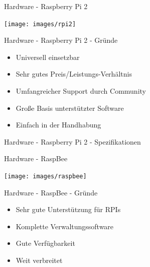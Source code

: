 \begin{frame}{Hardware - Raspberry Pi 2}
  \begin{center}
    \texttt{[image: images/rpi2]}
    \label{fig:rpi}
  \end{center}
\end{frame}

\begin{frame}{Hardware - Raspberry Pi 2 - Gründe}
  \Large
  \begin{itemize}
    \item Universell einsetzbar
    \item Sehr gutes Preis/Leistungs-Verhältnis
    \item Umfangreicher Support durch Community
    \item Große Basis unterstützter Software
    \item Einfach in der Handhabung
  \end{itemize}
\end{frame}

\begin{frame}{Hardware - Raspberry Pi 2 - Spezifikationen}
  \Large

\end{frame}

\begin{frame}{Hardware - RaspBee}
  \begin{center}
    \texttt{[image: images/raspbee]}
    \label{fig:rbee}
  \end{center}
\end{frame}

\begin{frame}{Hardware - RaspBee - Gründe}
  \Large
  \begin{itemize}
    \item Sehr gute Unterstützung für RPIs
    \item Komplette Verwaltungssoftware
    \item Gute Verfügbarkeit
    \item Weit verbreitet
  \end{itemize}
\end{frame}

